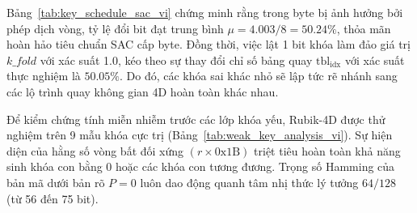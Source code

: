 \documentclass[10pt,twocolumn]{article}
\begin{document}
Bảng~\ref{tab:key_schedule_sac_vi} chứng minh rằng trong byte bị ảnh hưởng bởi phép dịch vòng, tỷ lệ đổi bit đạt trung bình $\mu = 4.003 / 8 = 50.24\%$, thỏa mãn hoàn hảo tiêu chuẩn SAC cấp byte. Đồng thời, việc lật 1 bit khóa làm đảo giá trị $k\_fold$ với xác suất 1.0, kéo theo sự thay đổi chỉ số bảng quay $\text{tbl}_{\text{idx}}$ với xác suất thực nghiệm là $50.05\%$. Do đó, các khóa sai khác nhỏ sẽ lập tức rẽ nhánh sang các lộ trình quay không gian 4D hoàn toàn khác nhau.

\begin{table}[htbp]
\caption{Phân tích lớp khóa yếu dưới các mẫu khóa cực trị.}
\label{tab:weak_key_analysis_vi}
\centering
\small
{}
\end{table}

Để kiểm chứng tính miễn nhiễm trước các lớp khóa yếu, Rubik-4D được thử nghiệm trên 9 mẫu khóa cực trị (Bảng~\ref{tab:weak_key_analysis_vi}). Sự hiện diện của hằng số vòng bất đối xứng $(r \times \text{0x1B})$ triệt tiêu hoàn toàn khả năng sinh khóa con bằng 0 hoặc các khóa con tương đương. Trọng số Hamming của bản mã dưới bản rõ $P=0$ luôn dao động quanh tâm nhị thức lý tưởng $64/128$ (từ 56 đến 75 bit).
\end{document}
